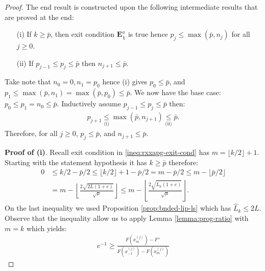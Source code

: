 \documentclass[12pt]{report}
\begin{document}
        \begin{proof}
            The end result is constructed upon the following intermediate results that are proved at the end: 
            \begin{enumerate}
                \item [(i)] If $k \ge \bar p$, then exit condition $\mathbf E_{\chi}^a$ is true hence $p_j \le \max(\bar p, n_j)$ for all $j \ge 0$. 
                \item [(ii)] If $p_{j - 1} \le p_j\le \bar p$  then $n_{j + 1} \le \bar p$. 
            \end{enumerate}
            Take note that $n_0 = 0, n_1 = p_0$ hence (i) gives $p_0 \le \bar p$, and $p_1 \le \max(\bar p, n_1) = \max(\bar p, p_0) \le \bar p$. 
            We now have the base case: $p_0 \le p_1 = n_0 \le \bar p$. 
            Inductively assume $p_{j - 1} \le p_j \le \bar p$ then: 
            \begin{align*}
                p_{j + 1} \underset{\text{(i)}}{\le} \max(\bar p, n_{j + 1}) \underset{\text{(ii)}}{\le} \bar p. 
            \end{align*}
            Therefore, for all $j \ge 0$, $p_j \le \bar p$, and $n_{j + 1} \le \bar p$. 
            \par
            \textbf{Proof of (i)}. 
            Recall exit condition in \eqref{ineq:rxxapg-exit-cond} has $m = \lfloor k/2\rfloor + 1$. 
            Starting with the statement hypothesis it has $k \ge \bar p$ therefore: 
            \begin{align*}
                0 &\le k/2 - \bar p/2 \le \lfloor k/2\rfloor + 1 - \bar p/2
                = m - \bar p /2 \le m - \lfloor \bar p/2\rfloor
                \\
                &= m - \left\lfloor 
                    \frac{2\sqrt{2L(1 + e)}}{\sqrt{\mu}}
                \right\rfloor \le 
                m - \left\lfloor 
                    \frac{2\sqrt{\widehat L_k(1 + e)}}{\sqrt{\mu}}
                \right\rfloor. 
            \end{align*}
            On the last inequality we used Proposition \ref{prop:bnded-lip-ls} which has $\widehat L_k \le 2 L$. 
            Observe that the inequality allow us to apply Lemma \ref{lemma:prog-ratio} with $m = k$ which yields: 
            \begin{align*}
                e^{-1} \ge 
                \frac{
                    F\left(x_{m}^{(j)}\right) - F^+
                }{
                    F\left(x_{-1}^{(j)}\right) 
                    - F\left(x_{m}^{(j)}\right)
}
\end{align*}
\end{proof}
\end{document}
